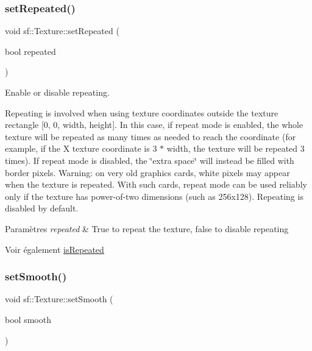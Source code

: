 \subsubsection{\texorpdfstring{set\+Repeated()}{setRepeated()}}
{\footnotesize\ttfamily void sf\+::\+Texture\+::set\+Repeated (\begin{DoxyParamCaption}\item[{bool}]{repeated }\end{DoxyParamCaption})}



Enable or disable repeating. 

Repeating is involved when using texture coordinates outside the texture rectangle \mbox{[}0, 0, width, height\mbox{]}. In this case, if repeat mode is enabled, the whole texture will be repeated as many times as needed to reach the coordinate (for example, if the X texture coordinate is 3 $\ast$ width, the texture will be repeated 3 times). If repeat mode is disabled, the \char`\"{}extra space\char`\"{} will instead be filled with border pixels. Warning\+: on very old graphics cards, white pixels may appear when the texture is repeated. With such cards, repeat mode can be used reliably only if the texture has power-\/of-\/two dimensions (such as 256x128). Repeating is disabled by default.


\begin{DoxyParams}{Paramètres}
{\em repeated} & True to repeat the texture, false to disable repeating\\
\hline
\end{DoxyParams}
\begin{DoxySeeAlso}{Voir également}
\hyperlink{classsf_1_1Texture_af1a1a32ca5c799204b2bea4040df7647}{is\+Repeated} 
\end{DoxySeeAlso}
\mbox{\label{classsf_1_1Texture_a0c3bd6825b9a99714f10d44179d74324}} 
\subsubsection{\texorpdfstring{set\+Smooth()}{setSmooth()}}
{\footnotesize\ttfamily void sf\+::\+Texture\+::set\+Smooth (\begin{DoxyParamCaption}\item[{bool}]{smooth }\end{DoxyParamCaption})}



